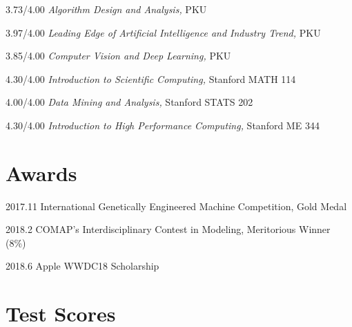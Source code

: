 \documentclass{academiccv}
\begin{document}
\begin{tablist}

\item[3.73/4.00] \tab \emph{Algorithm Design and Analysis}\emph, PKU
\item[3.97/4.00] \tab  \emph{Leading Edge of Artificial Intelligence and Industry Trend}\emph, PKU
\item[3.85/4.00] \tab \emph{Computer Vision and Deep Learning}\emph, PKU
\item[4.30/4.00] \tab \emph{Introduction to Scientific Computing}\emph, Stanford MATH 114

\item[4.00/4.00] \tab \emph{Data Mining and Analysis}\emph, Stanford STATS 202

\item[4.30/4.00] \tab \emph{Introduction to High Performance Computing}\emph, Stanford ME 344

\end{tablist}


\section*{Awards}

\begin{tablist}
	\item[2017.11] \tab International Genetically Engineered Machine Competition, Gold Medal

	\item[2018.2] \tab COMAP's Interdisciplinary Contest in Modeling, Meritorious Winner (8\%)

	\item[2018.6] \tab Apple WWDC18 Scholarship

	\end{tablist}


\section*{Test Scores}
\end{document}
